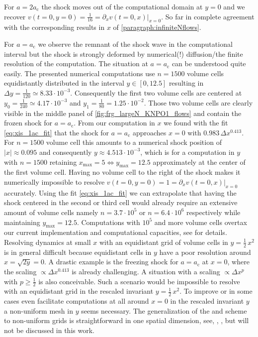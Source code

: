 For $a=2a_\mathrm{c}$ the shock moves out of the computational domain at $y=0$ and we recover ${v(t=0,y=0)=\frac{1}{16}=\partial_x v(t=0,x)\big|_{x = 0}}$. So far in complete agreement with the corresponding results in $x$ of \cref{paragraph:infiniteNflows}.

For $a=a_\mathrm{c}$ we observe the remnant of the shock wave in the computational interval but the shock is strongly deformed by numerical(!) diffusion/the finite resolution of the computation.
The situation at $a=a_\mathrm{c}$ can be understood quite easily.
The presented numerical computations use ${n=1500}$ volume cells equidistantly distributed in the interval ${y \in [ 0, 12.5 ]}$ resulting in ${\Delta y = \frac{1}{120} \simeq 8.33 \cdot 10^{-3}}$. 
Consequently the first two volume cells are centered at ${y_0 = \frac{1}{240} \simeq 4.17 \cdot 10^{-3}}$ and ${y_1 = \frac{1}{80} = 1.25 \cdot 10^{-2}}$.
Those two volume cells are clearly visible in the middle panel of \cref{fig:frg_largeN_KNPO1_flows} and contain the frozen shock for ${a = a_\mathrm{c}}$.
From our computation in $x$ we found with the fit \eqref{eq:xis_1ac_fit} that the shock for $a = a_\mathrm{c}$ approaches $x = 0$ with $0.983 \, \Delta x^{0.413}$.
For ${n = 1500}$ volume cell this amounts to a numerical shock position of ${| x | \approx 0.095}$ and consequently ${y \approx 4.513 \cdot 10^{-3}}$, which is for a computation in $y$ with ${n = 1500}$ retaining ${x_\mathrm{max} = 5 \Leftrightarrow y_\mathrm{max} = 12.5}$ approximately at the center of the first volume cell.
Having no volume cell to the right of the shock makes it numerically impossible to resolve ${v(t=0,y=0)=1=\partial_x v(t=0,x)\big|_{x = 0}}$ accurately.
Using the fit \eqref{eq:xis_1ac_fit} we can extrapolate that having the shock centered in the second or third cell would already require an extensive amount of volume cells namely ${n=3.7\cdot 10^5}$ or ${n=6.4\cdot 10^6}$ respectively while maintaining ${y_\mathrm{max}=12.5}$.
Computations with $10^5$ and more volume cells overtax our current implementation and computational capacities, see \LargeNnumApp{} for details.
Resolving dynamics at small $x$ with an equidistant grid of volume cells in $y = \tfrac{1}{2} \, x^2$ is in general difficult because equidistant cells in $y$ have a poor resolution around $x = \sqrt{2 y} = 0$.
A drastic example is the freezing shock for $a = a_\mathrm{c}$ at $x = 0$, where the scaling $\propto \Delta x^{0.413}$ is already challenging.
A situation with a scaling $\propto\Delta x^{p}$ with $p\geq\frac{1}{2}$ is also conceivable. Such a scenario would be impossible to resolve with an equidistant grid in the rescaled invariant $y = \frac{1}{2} \, x^2$.
To improve or in some cases even facilitate computations at all around $x=0$ in the rescaled invariant $y$ a non-uniform mesh in $y$ seems necessary.
The generalization of the \kt{} and \knp{} scheme to non-uniform grids is straightforward in one spatial dimension, see, \eg{}, , but will not be discussed in this work. 

